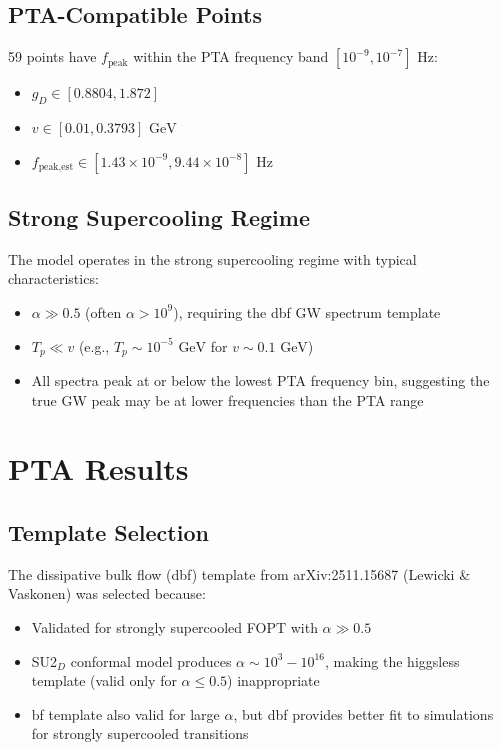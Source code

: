 \documentclass[11pt,a4paper,oneside]{article}
\begin{document}
\subsection{PTA-Compatible Points}
59 points have $f_{\text{peak}}$ within the PTA frequency band $[10^{-9}, 10^{-7}] \text{ Hz}$:
\begin{itemize}
\item $g_D \in [0.8804, 1.872]$
\item $v \in [0.01, 0.3793] \text{ GeV}$
\item $f_{\text{peak,est}} \in [1.43 \times 10^{-9}, 9.44 \times 10^{-8}] \text{ Hz}$
\end{itemize}

\subsection{Strong Supercooling Regime}
The model operates in the strong supercooling regime with typical characteristics:
\begin{itemize}
\item $\alpha \gg 0.5$ (often $\alpha > 10^9$), requiring the dbf GW spectrum template
\item $T_p \ll v$ (e.g., $T_p \sim 10^{-5} \text{ GeV}$ for $v \sim 0.1 \text{ GeV}$)
\item All spectra peak at or below the lowest PTA frequency bin, suggesting the true GW peak may be at lower frequencies than the PTA range
\end{itemize}

\section{PTA Results}
\label{sec:pta}

\subsection{Template Selection}
The dissipative bulk flow (dbf) template from arXiv:2511.15687 (Lewicki \& Vaskonen) was selected because:
\begin{itemize}
\item Validated for strongly supercooled FOPT with $\alpha \gg 0.5$
\item SU2$_D$ conformal model produces $\alpha \sim 10^3{-}10^{16}$, making the higgsless template (valid only for $\alpha \leq 0.5$) inappropriate
\item bf template also valid for large $\alpha$, but dbf provides better fit to simulations for strongly supercooled transitions
\end{itemize}
\end{document}

